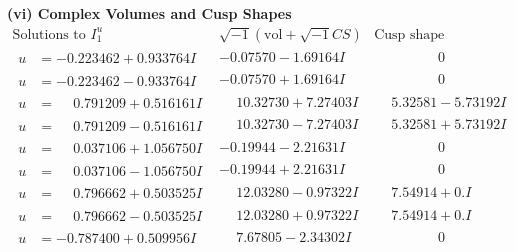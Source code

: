 \documentclass[1p]{elsarticle_modified}
\theoremstyle{definition}
\newcommand{\I}{\sqrt{-1}}
\begin{document}
\newpage\flushleft \textbf{(vi) Complex Volumes and Cusp Shapes}
$$\begin{array}{c|c|c}  
\text{Solutions to }I^u_{1}& \I (\text{vol} + \sqrt{-1}CS) & \text{Cusp shape}\\
 \hline 
\begin{aligned}
u &= -0.223462 + 0.933764 I\end{aligned}
 & -0.07570 - 1.69164 I & \phantom{-0.000000 } 0 \\ \hline\begin{aligned}
u &= -0.223462 - 0.933764 I\end{aligned}
 & -0.07570 + 1.69164 I & \phantom{-0.000000 } 0 \\ \hline\begin{aligned}
u &= \phantom{-}0.791209 + 0.516161 I\end{aligned}
 & \phantom{-}10.32730 + 7.27403 I & \phantom{-}5.32581 - 5.73192 I \\ \hline\begin{aligned}
u &= \phantom{-}0.791209 - 0.516161 I\end{aligned}
 & \phantom{-}10.32730 - 7.27403 I & \phantom{-}5.32581 + 5.73192 I \\ \hline\begin{aligned}
u &= \phantom{-}0.037106 + 1.056750 I\end{aligned}
 & -0.19944 - 2.21631 I & \phantom{-0.000000 } 0 \\ \hline\begin{aligned}
u &= \phantom{-}0.037106 - 1.056750 I\end{aligned}
 & -0.19944 + 2.21631 I & \phantom{-0.000000 } 0 \\ \hline\begin{aligned}
u &= \phantom{-}0.796662 + 0.503525 I\end{aligned}
 & \phantom{-}12.03280 - 0.97322 I & \phantom{-}7.54914 + 0. I\phantom{ +0.000000I} \\ \hline\begin{aligned}
u &= \phantom{-}0.796662 - 0.503525 I\end{aligned}
 & \phantom{-}12.03280 + 0.97322 I & \phantom{-}7.54914 + 0. I\phantom{ +0.000000I} \\ \hline\begin{aligned}
u &= -0.787400 + 0.509956 I\end{aligned}
 & \phantom{-}7.67805 - 2.34302 I & \phantom{-0.000000 } 0 \\ \hline\begin{aligned}

\end{aligned}
\end{array}$$
\end{document}
